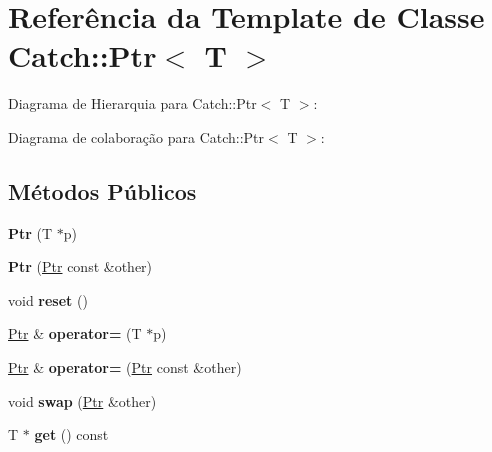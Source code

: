 \hypertarget{classCatch_1_1Ptr}{}\section{Referência da Template de Classe Catch\+:\+:Ptr$<$ T $>$}
\label{classCatch_1_1Ptr}


Diagrama de Hierarquia para Catch\+:\+:Ptr$<$ T $>$\+:


Diagrama de colaboração para Catch\+:\+:Ptr$<$ T $>$\+:
\subsection*{Métodos Públicos}
\begin{DoxyCompactItemize}
\item 
{\bfseries Ptr} (T $\ast$p)\hypertarget{classCatch_1_1Ptr_aacec063a79cd142e39040a31c6b3c40b}{}\label{classCatch_1_1Ptr_aacec063a79cd142e39040a31c6b3c40b}

\item 
{\bfseries Ptr} (\hyperlink{classCatch_1_1Ptr}{Ptr} const \&other)\hypertarget{classCatch_1_1Ptr_ac629dd8ebe5763a37bb89e6c1d6a1771}{}\label{classCatch_1_1Ptr_ac629dd8ebe5763a37bb89e6c1d6a1771}

\item 
void {\bfseries reset} ()\hypertarget{classCatch_1_1Ptr_af8d0fa7a2cd20842830b354ac31dfe5c}{}\label{classCatch_1_1Ptr_af8d0fa7a2cd20842830b354ac31dfe5c}

\item 
\hyperlink{classCatch_1_1Ptr}{Ptr} \& {\bfseries operator=} (T $\ast$p)\hypertarget{classCatch_1_1Ptr_a9b08c868b447d679ed201921f5c94683}{}\label{classCatch_1_1Ptr_a9b08c868b447d679ed201921f5c94683}

\item 
\hyperlink{classCatch_1_1Ptr}{Ptr} \& {\bfseries operator=} (\hyperlink{classCatch_1_1Ptr}{Ptr} const \&other)\hypertarget{classCatch_1_1Ptr_af42074444c1bc6a70ebdc406a8617708}{}\label{classCatch_1_1Ptr_af42074444c1bc6a70ebdc406a8617708}

\item 
void {\bfseries swap} (\hyperlink{classCatch_1_1Ptr}{Ptr} \&other)\hypertarget{classCatch_1_1Ptr_a172bf8b4e71e26a5a4d92f5b02158b50}{}\label{classCatch_1_1Ptr_a172bf8b4e71e26a5a4d92f5b02158b50}

\item 
T $\ast$ {\bfseries get} () const \hypertarget{classCatch_1_1Ptr_a1617aa5ff058b53ea572cf965617b7ae}{}\label{classCatch_1_1Ptr_a1617aa5ff058b53ea572cf965617b7ae}


\end{DoxyCompactItemize}
